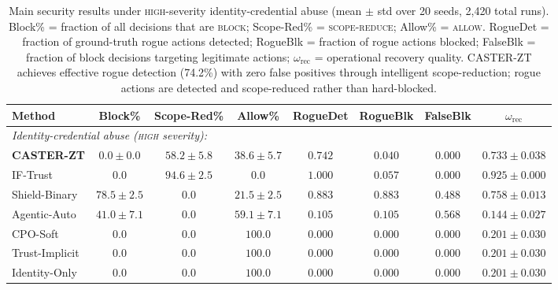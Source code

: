 \documentclass[10pt,journal,compsoc]{IEEEtran}
\begin{document}
\begin{table}[t]
\centering
\caption{Main security results under \textsc{high}-severity identity-credential abuse (mean $\pm$ std over 20 seeds, 2{,}420 total runs).  Block\% = fraction of all decisions that are \textsc{block}; Scope-Red\% = \textsc{scope-reduce}; Allow\% = \textsc{allow}.  RogueDet = fraction of ground-truth rogue actions detected; RogueBlk = fraction of rogue actions blocked; FalseBlk = fraction of block decisions targeting legitimate actions; $\omega_{\mathrm{rec}}$ = operational recovery quality.  CASTER-ZT achieves effective rogue detection (74.2\%) with zero false positives through intelligent scope-reduction; rogue actions are detected and scope-reduced rather than hard-blocked.}
\label{tab:main_results}
\footnotesize
\begin{tabular}{lccccccc}
\toprule
Method & Block\% & Scope-Red\% & Allow\% & RogueDet & RogueBlk & FalseBlk & $\omega_{\mathrm{rec}}$ \\
\midrule
\multicolumn{8}{l}{\textit{Identity-credential abuse (\textsc{high} severity):}} \\[2pt]
\textbf{CASTER-ZT}                                & $0.0\pm0.0$   & $58.2\pm5.8$  & $38.6\pm5.7$   & $\mathbf{0.742}$ & $\mathbf{0.040}$ & $\mathbf{0.000}$ & $\mathbf{0.733\pm0.038}$ \\
IF-Trust~\cite{zahoor2025ifocsvm}                  & $0.0$         & $94.6\pm2.5$  & $0.0$         & $1.000$          & $0.057$          & $0.000$          & $0.925\pm0.000$ \\
Shield-Binary~\cite{alshiekh2018shielding}         & $78.5\pm2.5$  & $0.0$         & $21.5\pm2.5$  & $0.883$          & $0.883$          & $0.488$          & $0.758\pm0.013$ \\
Agentic-Auto~\cite{toward_autonomous_oran_2026}    & $41.0\pm7.1$  & $0.0$         & $59.1\pm7.1$  & $0.105$          & $0.105$          & $0.568$          & $0.144\pm0.027$ \\
CPO-Soft~\cite{achiam2017cpo}                      & $0.0$         & $0.0$         & $100.0$       & $0.000$          & $0.000$          & $0.000$          & $0.201\pm0.030$ \\
Trust-Implicit                                     & $0.0$         & $0.0$         & $100.0$       & $0.000$          & $0.000$          & $0.000$          & $0.201\pm0.030$ \\
Identity-Only                                      & $0.0$         & $0.0$         & $100.0$       & $0.000$          & $0.000$          & $0.000$          & $0.201\pm0.030$ \\

\end{tabular}
\end{table}
\end{document}

